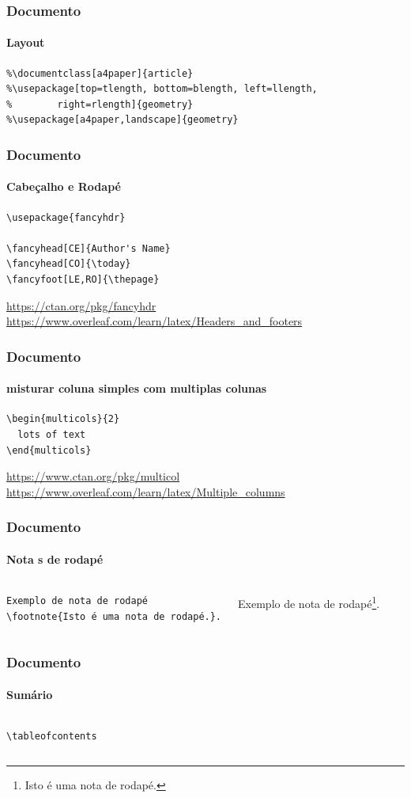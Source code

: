 \begin{frame}[fragile]
\frametitle{Documento}
\framesubtitle{Layout}
  \scriptsize
  \begin{verbatim}
%\documentclass[a4paper]{article}
%\usepackage[top=tlength, bottom=blength, left=llength,
%        right=rlength]{geometry}
%\usepackage[a4paper,landscape]{geometry}
  \end{verbatim} 
\end{frame}


\begin{frame}[fragile]
\frametitle{Documento}
\framesubtitle{Cabeçalho e Rodapé}
  \scriptsize
  \begin{verbatim}
\usepackage{fancyhdr}

\fancyhead[CE]{Author's Name}
\fancyhead[CO]{\today}
\fancyfoot[LE,RO]{\thepage}
  \end{verbatim} 
  
  \url{https://ctan.org/pkg/fancyhdr}
  \url{https://www.overleaf.com/learn/latex/Headers_and_footers}
\end{frame}


\begin{frame}[fragile]
\frametitle{Documento}
\framesubtitle{misturar coluna simples com multiplas colunas}
\scriptsize
\begin{verbatim}
\begin{multicols}{2}
  lots of text
\end{multicols}
\end{verbatim} 

\url{https://www.ctan.org/pkg/multicol}
\url{https://www.overleaf.com/learn/latex/Multiple_columns}
\end{frame}


\begin{frame}[fragile]
\frametitle{Documento}
\framesubtitle{Nota s de rodapé}
  \scriptsize
  \begin{columns}[c]
  \begin{verbatim}
Exemplo de nota de rodapé
\footnote{Isto é uma nota de rodapé.}.
  \end{verbatim} 
  \begin{fmpage}{\textwidth}
  Exemplo de nota de rodapé\footnote{Isto é uma nota de rodapé.}.
  \vspace{5cm}
  \end{fmpage}
  \end{columns}
\end{frame}

\begin{frame}[fragile]
\frametitle{Documento}
\framesubtitle{Sumário}
  \scriptsize
  \begin{columns}[c]
  \begin{verbatim}
\tableofcontents
  \end{verbatim} 
  \begin{fmpage}{\textwidth}
  \scriptsize
  \tableofcontents
  \end{fmpage}
  \end{columns}
\end{frame}


